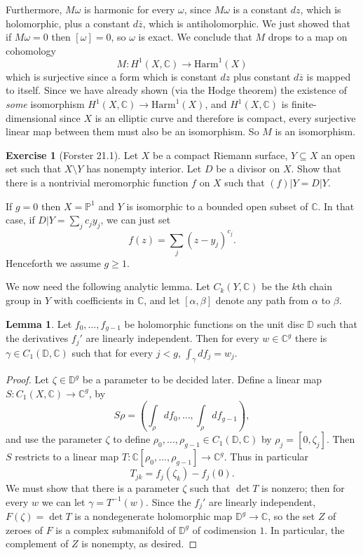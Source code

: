 \documentclass[10pt]{article}
\newcommand{\CC}{\mathbb{C}}
\newcommand{\PP}{\mathbb P}
\newcommand{\DD}{\mathbb D}
\theoremstyle{definition}
\newtheorem{exer}{Exercise}
\newtheorem{lemma}{Lemma}[exer]
\begin{document}
Furthermore, $M\omega$ is harmonic for every $\omega$, since $M\omega$ is a constant $dz$, which is holomorphic, plus a constant $d\overline z$, which is antiholomorphic.
We just showed that if $M\omega = 0$ then $[\omega] = 0$, so $\omega$ is exact.
We conclude that $M$ drops to a map on cohomology
$$M: H^1(X, \CC) \to \text{Harm}^1(X)$$
which is surjective since a form which is constant $dz$ plus constant $d\overline z$ is mapped to itself.
Since we have already shown (via the Hodge theorem) the existence of \emph{some} isomorphism $H^1(X, \CC) \to \text{Harm}^1(X)$, and $H^1(X, \CC)$ is finite-dimensional since $X$ is an elliptic curve and therefore is compact, every surjective linear map between them must also be an isomorphism.
So $M$ is an isomorphism.

\begin{exer}[Forster 21.1]
Let $X$ be a compact Riemann surface, $Y \subseteq X$ an open set such that $X \setminus Y$ has nonempty interior.
Let $D$ be a divisor on $X$. Show that there is a nontrivial meromorphic function $f$ on $X$ such that $(f)|Y = D|Y$.
\end{exer}

If $g = 0$ then $X = \PP^1$ and $Y$ is isomorphic to a bounded open subset of $\CC$.
In that case, if $D|Y = \sum_j c_j y_j$, we can just set
$$f(z) = \sum_j (z - y_j)^{c_j}.$$
Henceforth we assume $g \geq 1$.

We now need the following analytic lemma. Let $C_k(Y, \CC)$ be the $k$th chain group in $Y$ with coefficients in $\CC$, and let $[\alpha, \beta]$ denote any path from $\alpha$ to $\beta$.
\begin{lemma}
Let $f_0, \dots, f_{g - 1}$ be holomorphic functions on the unit disc $\DD$ such that the derivatives $f_j'$ are linearly independent.
Then for every $w \in \CC^g$ there is $\gamma \in C_1(\DD, \CC)$ such that for every $j < g$, $\int_\gamma df_j = w_j$.
\end{lemma}
\begin{proof}
Let $\zeta \in \DD^g$ be a parameter to be decided later.
Define a linear map $S: C_1(X, \CC) \to \CC^g$, by
$$S\rho = \left(\int_\rho df_0, \dots, \int_\rho df_{g - 1}\right),$$
and use the parameter $\zeta$ to define $\rho_0, \dots, \rho_{g - 1} \in C_1(\DD, \CC)$ by $\rho_j = [0, \zeta_j]$.
Then $S$ restricts to a linear map $T: \CC[\rho_0, \dots, \rho_{g - 1}] \to \CC^g$.
Thus in particular
$$T_{jk} = f_j(\zeta_k) - f_j(0).$$
We must show that there is a parameter $\zeta$ such that $\det T$ is nonzero; then for every $w$ we can let $\gamma = T^{-1}(w)$.
Since the $f_j'$ are linearly independent, $F(\zeta) = \det T$ is a nondegenerate holomorphic map $\DD^g \to \CC$, so the set $Z$ of zeroes of $F$ is a complex submanifold of $\DD^g$ of codimension $1$.
In particular, the complement of $Z$ is nonempty, as desired.
\end{proof}
\end{document}
